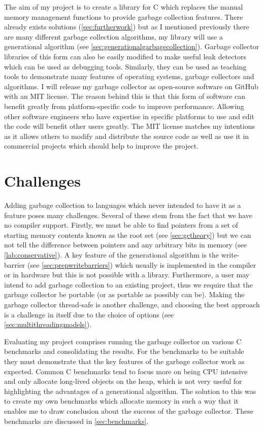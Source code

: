 \documentclass[../diss.tex]{subfiles}
\begin{document}
The aim of my project is to create a library for C which replaces the manual memory management functions to provide garbage collection features. There already exists solutions (\cref{sec:furtherwork}) but as I mentioned previously there are many different garbage collection algorithms, my library will use a generational algorithm (see \cref{sec:generationalgarbagecollection}). Garbage collector libraries of this form can also be easily modified to make useful leak detectors which can be used as debugging tools. Similarly, they can be used as teaching tools to demonstrate many features of operating systems, garbage collectors and algorithms. I will release my garbage collector as open-source software on GitHub with an MIT license. The reason behind this is that this form of software can benefit greatly from platform-specific code to improve performance. Allowing other software engineers who have expertise in specific platforms to use and edit the code will benefit other users greatly. The MIT license matches my intentions as it allows others to modify and distribute the source code as well as use it in commercial projects which should help to improve the project.

\section{Challenges}

Adding garbage collection to languages which never intended to have it as a feature poses many challenges. Several of these stem from the fact that we have no compiler support. Firstly, we must be able to find pointers from a set of starting memory contents known as the root set (see \cref{sec:gctheory}) but we can not tell the difference between pointers and any arbitrary bits in memory (see \cref{lab:conservative}). A key feature of the generational algorithm is the write-barrier (see \cref{sec:prepwritebarriers}) which usually is implemented in the compiler or in hardware but this is not possible with a library. Furthermore, a user may intend to add garbage collection to an existing project, thus we require that the garbage collector be portable (or as portable as possibly can be). Making the garbage collector thread-safe is another challenge, and choosing the best approach is a challenge in itself due to the choice of options (see \cref{sec:multithreadingmodels}). 

Evaluating my project comprises running the garbage collector on various C benchmarks and consolidating the results. For the benchmarks to be suitable they must demonstrate that the key features of the garbage collector work as expected. Common C benchmarks tend to focus more on being CPU intensive and only allocate long-lived objects on the heap, which is not very useful for highlighting the advantages of a generational algorithm. The solution to this was to create my own benchmarks which allocate memory in such a way that it enables me to draw conclusion about the success of the garbage collector. These benchmarks are discussed in \cref{sec:benchmarks}.
\end{document}
